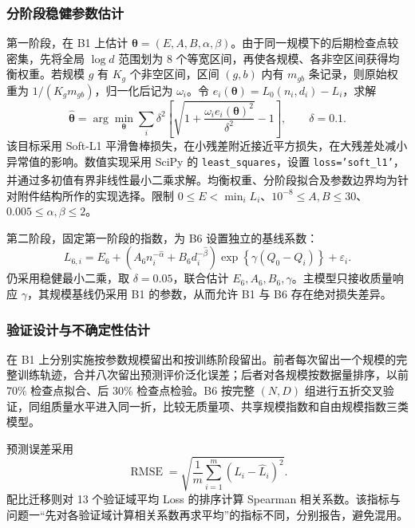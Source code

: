 \documentclass[bwprint]{gmcmthesis}
\numberwithin{equation}{section}
\numberwithin{figure}{section}
\numberwithin{table}{section}
\begin{document}
        \subsubsection{分阶段稳健参数估计}  %
        第一阶段，在 B1 上估计 $\bm\theta=(E,A,B,\alpha,\beta)$。由于同一规模下的后期检查点较密集，先将全局 $\log d$ 范围划为 8 个等宽区间，再使各规模、各非空区间获得均衡权重。若规模 $g$ 有 $K_g$ 个非空区间，区间 $(g,b)$ 内有 $m_{gb}$ 条记录，则原始权重为 $1/(K_gm_{gb})$，归一化后记为 $\omega_i$。令 $e_i(\bm\theta)=L_0(n_i,d_i)-L_i$，求解
        \begin{equation}
         \widehat{\bm\theta}=\arg\min_{\bm\theta}
         \sum_i\delta^2\left[\sqrt{1+\frac{\omega_i e_i(\bm\theta)^2}{\delta^2}}-1\right],
         \qquad \delta=0.1.
         \label{eq:p2_fit}
        \end{equation}
        该目标采用 Soft-L1 平滑鲁棒损失，在小残差附近接近平方损失，在大残差处减小异常值的影响。数值实现采用 SciPy 的 \texttt{least\_squares}，设置 \texttt{loss='soft\_l1'}，并通过多初值有界非线性最小二乘求解\textsuperscript{\cite{virtanen2020scipy}}。均衡权重、分阶段拟合及参数边界均为针对附件结构所作的实现选择。限制 $0\leq E<\min_iL_i$、$10^{-8}\leq A,B\leq30$、$0.005\leq\alpha,\beta\leq2$。
        
        第二阶段，固定第一阶段的指数，为 B6 设置独立的基线系数：
        \begin{equation}
         L_{6,i}=E_6+\left(A_6n_i^{-\widehat\alpha}+B_6d_i^{-\widehat\beta}\right)
         \exp\!\left\{\gamma(Q_0-Q_i)\right\}+\varepsilon_i.
         \label{eq:p2_fit_quality}
        \end{equation}
        仍采用稳健最小二乘，取 $\delta=0.05$，联合估计 $E_6,A_6,B_6,\gamma$。主模型只接收质量响应 $\gamma$，其规模基线仍采用 B1 的参数，从而允许 B1 与 B6 存在绝对损失差异。
    
        \subsubsection{验证设计与不确定性估计}  %
        在 B1 上分别实施按参数规模留出和按训练阶段留出。前者每次留出一个规模的完整训练轨迹，合并八次留出预测评价泛化误差；后者对各规模按数据量排序，以前 70\% 检查点拟合、后 30\% 检查点检验。B6 按完整 $(N,D)$ 组进行五折交叉验证，同组质量水平进入同一折，比较无质量项、共享规模指数和自由规模指数三类模型。
        
        预测误差采用
        \begin{equation}
         \operatorname{RMSE}=\sqrt{\frac1m\sum_{i=1}^{m}(L_i-\widehat L_i)^2}.
         \label{eq:p2_rmse}
        \end{equation}
        配比迁移则对 13 个验证域平均 Loss 的排序计算 Spearman 相关系数。该指标与问题一“先对各验证域计算相关系数再求平均”的指标不同，分别报告，避免混用。
        
\end{document}
